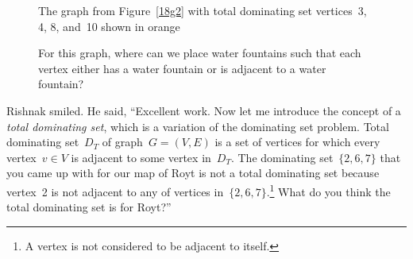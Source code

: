 \begin{figure}
\begin{center}

\caption{The graph from Figure~\ref{18g2} with total dominating set vertices~3, 4, 8, and~10 shown in orange}\label{18g4}
\end{center}
\end{figure}

\begin{figure}
\begin{center}

\caption{For this graph, where can we place water fountains such that each vertex either has a water fountain or is adjacent to a water fountain?}\label{18q1}
\end{center}
\end{figure}

Rishnak smiled. He said, ``Excellent work. Now let me introduce the concept of a \textit{total dominating set}, which is a variation of the dominating set problem. Total dominating set~$D_T$ of graph~$G=(V,E)$ is a set of vertices for which every vertex~$v\in V$ is adjacent to some vertex in~$D_T$. The dominating set~$\{2,6,7\}$ that you came up with for our map of Royt is not a total dominating set because vertex~2 is not adjacent to any of vertices in~$\{2,6,7\}$.\footnote{A vertex is not considered to be adjacent to itself.} What do you think the total dominating set is for Royt?''

